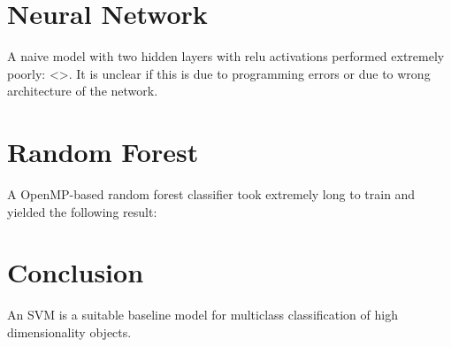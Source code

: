 \documentclass{article}
\begin{document}
\section{Neural Network}
A naive model with two hidden layers with relu activations performed extremely poorly: <>.
It is unclear if this is due to programming errors or due to wrong architecture of the network.


\section{Random Forest}
A OpenMP-based random forest classifier took extremely long to train and yielded the following result:


\section{Conclusion}
An SVM is a suitable baseline model for multiclass classification of high dimensionality objects.


%
\printbibliography
\end{document}

